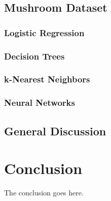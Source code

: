 \documentclass[conference]{IEEEtran}
\begin{document}
\subsection{Mushroom Dataset}
\subsubsection{Logistic Regression}
\subsubsection{Decision Trees}
\subsubsection{k-Nearest Neighbors}
\subsubsection{Neural Networks}

\subsection{General Discussion}

\section{Conclusion}
The conclusion goes here.

\nocite{*}
\def\BibTeX{BibTeX}


\end{document}
